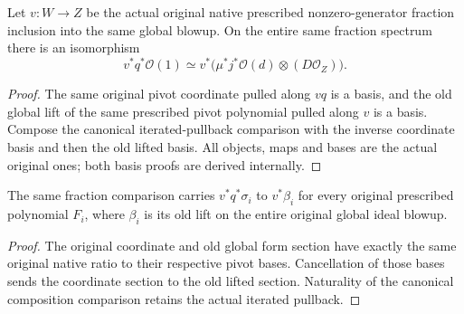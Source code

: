 \begin{definition}
\label{def:whole-original-global-fraction-line-comparison}
\leanok
{}
Let $v:W\to Z$ be the actual original native prescribed nonzero-generator
fraction inclusion into the same global blowup. On the entire same fraction
spectrum there is an isomorphism
\[
 v^*q^*\mathcal O(1)\simeq v^*\bigl(\mu^*j^*\mathcal O(d)\otimes(D\mathcal O_Z)\bigr).
\]
\end{definition}
\begin{proof}
The same original pivot coordinate pulled along $vq$ is a basis, and the old
global lift of the same prescribed pivot polynomial pulled along $v$ is a
basis. Compose the canonical iterated-pullback comparison with the inverse
coordinate basis and then the old lifted basis. All objects, maps and bases
are the actual original ones; both basis proofs are derived internally.
\end{proof}

\begin{proposition}
\label{prop:whole-original-global-fraction-line-sections}
\leanok
{}
The same fraction comparison carries $v^*q^*\sigma_i$ to $v^*\beta_i$ for
every original prescribed polynomial $F_i$, where $\beta_i$ is its old lift
on the entire original global ideal blowup.
\end{proposition}
\begin{proof}
The original coordinate and old global form section have exactly the same
original native ratio to their respective pivot bases. Cancellation of those
bases sends the coordinate section to the old lifted section. Naturality of
the canonical composition comparison retains the actual iterated pullback.
\end{proof}
